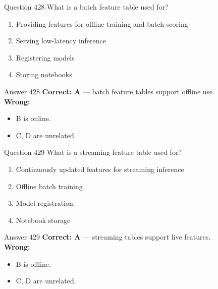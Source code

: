 \documentclass[aspectratio=169,11pt]{beamer}
\begin{document}
	\begin{frame}{Question 428}
		What is a batch feature table used for?
		\begin{enumerate}[label=\Alph*.]
			\item Providing features for offline training and batch scoring
			\item Serving low-latency inference
			\item Registering models
			\item Storing notebooks
		\end{enumerate}
	\end{frame}
	\begin{frame}{Answer 428}
		\textbf{Correct: A} --- batch feature tables support offline use.\\
		\vspace{0.5em}
		\textbf{Wrong:}
		\begin{itemize}
			\item B is online.
			\item C, D are unrelated.
		\end{itemize}
	\end{frame}
	
	\begin{frame}{Question 429}
		What is a streaming feature table used for?
		\begin{enumerate}[label=\Alph*.]
			\item Continuously updated features for streaming inference
			\item Offline batch training
			\item Model registration
			\item Notebook storage
		\end{enumerate}
	\end{frame}
	\begin{frame}{Answer 429}
		\textbf{Correct: A} --- streaming tables support live features.\\
		\vspace{0.5em}
		\textbf{Wrong:}
		\begin{itemize}
			\item B is offline.
			\item C, D are unrelated.
		\end{itemize}
	\end{frame}
	
\end{document}
